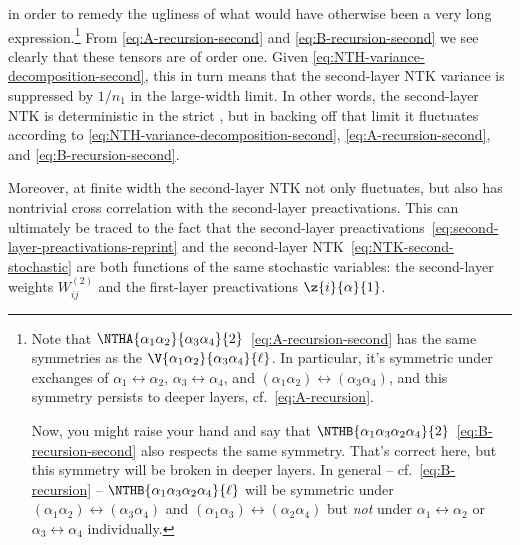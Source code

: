 \ee
in order to remedy the ugliness of what would have otherwise been a very long expression.\footnote{Note that $\NTHA{\alpha_1\alpha_2}{\alpha_3\alpha_4}{2}$~\eqref{eq:A-recursion-second} has the same symmetries as the  $\V{\alpha_1\alpha_2}{\alpha_3\alpha_4}{\ell}$. In particular, it's symmetric under exchanges of  $\alpha_1\leftrightarrow \alpha_2$, $\alpha_3\leftrightarrow \alpha_4$, and $(\alpha_1\alpha_2) \leftrightarrow (\alpha_3\alpha_4)$, and this symmetry persists to deeper layers, cf.~\eqref{eq:A-recursion}.

Now, you might raise your hand and say that $\NTHB{\alpha_1\alpha_3\alpha_2\alpha_4}{2}$~\eqref{eq:B-recursion-second} also respects the same symmetry. That's correct here, but this symmetry will be broken in deeper layers. In general -- cf.~\eqref{eq:B-recursion} -- $\NTHB{\alpha_1\alpha_3\alpha_2\alpha_4}{\ell}$ will be symmetric under  $(\alpha_1\alpha_2) \leftrightarrow (\alpha_3\alpha_4)$ and $(\alpha_1\alpha_3) \leftrightarrow (\alpha_2\alpha_4)$ but \emph{not} under $\alpha_1\leftrightarrow \alpha_2$ or $\alpha_3\leftrightarrow \alpha_4$ individually.}
From \eqref{eq:A-recursion-second} and \eqref{eq:B-recursion-second} we see clearly that these tensors are of order one. Given \eqref{eq:NTH-variance-decomposition-second}, this in turn means that the second-layer NTK variance is suppressed by $1/n_1$ in the large-width limit. In other words, the second-layer NTK is deterministic in the strict , but in backing off that limit it fluctuates according to \eqref{eq:NTH-variance-decomposition-second}, \eqref{eq:A-recursion-second}, and \eqref{eq:B-recursion-second}. 


Moreover, at finite width the second-layer NTK not only fluctuates, but also has nontrivial cross correlation with the second-layer preactivations. 
This can ultimately be traced to the fact that the second-layer preactivations~\eqref{eq:second-layer-preactivations-reprint} and the second-layer NTK~\eqref{eq:NTK-second-stochastic} 
are both functions of the same stochastic variables: the second-layer weights $W^{(2)}_{ij}$ and the first-layer preactivations $\z{i}{\alpha}{1}$.


